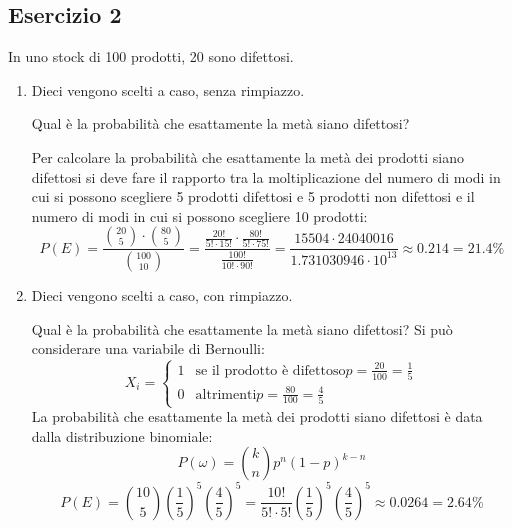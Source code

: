 \documentclass[a4paper]{article}
\theoremstyle{break}
\theoremstyle{break}
\theoremstyle{break}
\theoremstyle{break}
\begin{document}
\subsection{Esercizio 2}
In uno stock di 100 prodotti, 20 sono difettosi.
\begin{enumerate}
	\item Dieci vengono scelti a caso, senza rimpiazzo.

	      \noindent Qual è la probabilità che esattamente la metà siano difettosi?

	      \vspace{1em}
	      Per calcolare la probabilità che esattamente la metà dei prodotti siano difettosi
	      si deve fare il rapporto tra la moltiplicazione del numero di modi in cui si possono
	      scegliere 5 prodotti difettosi e 5 prodotti non difettosi e il numero di modi in
	      cui si possono scegliere 10 prodotti:
	      \[
		      P(E) = \frac{\binom{20}{5} \cdot \binom{80}{5}}{\binom{100}{10}} =
		      \frac{\frac{20!}{5! \cdot 15!}\cdot \frac{80!}{5! \cdot 75!}}{\frac{100!}{10! \cdot 90!}} =
		      \frac{15504 \cdot 24040016}{1.731030946 \cdot 10^{13}} \approx 0.214 = 21.4\%
	      \]
	\item Dieci vengono scelti a caso, con rimpiazzo.

	      \noindent Qual è la probabilità che esattamente la metà siano difettosi?
	      \vspace{1em}
	      Si può considerare una variabile di Bernoulli:
	      \[
		      X_i = \begin{cases}
			      1 & \text{se il prodotto è difettoso} p = \frac{20}{100} = \frac{1}{5} \\
			      0 & \text{altrimenti} p = \frac{80}{100} = \frac{4}{5}
		      \end{cases}
	      \]
	      La probabilità che esattamente la metà dei prodotti siano difettosi è data dalla
	      distribuzione binomiale:
	      \[
		      P(\omega) = \binom{k}{n} p^n (1-p)^{k-n}
	      \]
	      \[
		      P(E) = \binom{10}{5} \left( \frac{1}{5} \right)^5 \left( \frac{4}{5} \right)^5 =
		      \frac{10!}{5! \cdot 5!} \left( \frac{1}{5} \right)^5 \left( \frac{4}{5} \right)^5 \approx
		      0.0264 = 2.64\%
	      \]
\end{enumerate}
\end{document}
